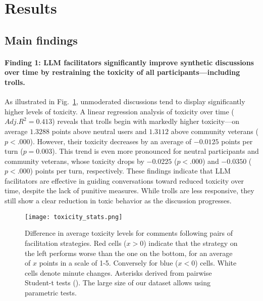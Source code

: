 %

\section{Results}
\label{sec:results}


\subsection{Main findings}
\label{ssec:results:main}

\paragraph{Finding 1: LLM facilitators significantly improve synthetic discussions over time by restraining the toxicity of all participants---including trolls.} As illustrated in Fig.~\ref{fig:toxicity_stats}, unmoderated discussions tend to display significantly higher levels of toxicity. A linear regression analysis of toxicity over time ($Adj. R^2 = 0.413$) reveals that trolls begin with markedly higher toxicity—on average $1.3288$ points above neutral users and $1.3112$ above community veterans ($p < .000$). However, their toxicity decreases by an average of $\minus0.0125$ points per turn ($p = 0.003$). This trend is even more pronounced for neutral participants and community veterans, whose toxicity drops by $\minus0.0225$ ($p < .000$) and $\minus0.0350$ ($p < .000$) points per turn, respectively. These findings indicate that LLM facilitators are effective in guiding conversations toward reduced toxicity over time, despite the lack of punitive measures. While trolls are less responsive, they still show a clear reduction in toxic behavior as the discussion progresses.

\begin{figure}
	\texttt{[image: toxicity\_stats.png]}
	\centering
	\caption{Difference in average toxicity levels for comments following pairs of facilitation strategies. Red cells ($x>0$) indicate that the strategy on the left performs worse than the one on the bottom, for an average of $x$ points in a scale of 1-5. Conversely for blue ($x<0$) cells. White cells denote minute changes. Asterisks derived from pairwise Student-t tests (\asterisknote). The large size of our dataset allows using parametric tests.}
	\label{fig:toxicity_stats}
\end{figure}

